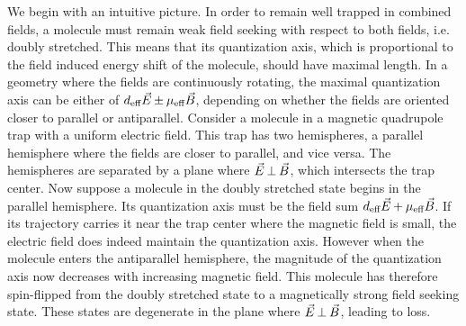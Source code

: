 \documentclass[%
 reprint,
 amsmath,amssymb,
 aps,
prl,
]{revtex4-1}
\newcommand{\epb}{{$\vec{E}\s {\perp}\s\vec{B}$}}
\newcommand{\s}{{\nobreak\hspace{.2em}}}
\begin{document}
We begin with an intuitive picture.
In order to remain well trapped in combined fields, a molecule must remain weak field seeking with respect to both fields, i.e. doubly stretched.
This means that its quantization axis, which is proportional to the field induced energy shift of the molecule, should have maximal length.
In a geometry where the fields are continuously rotating, the maximal quantization axis can be either of $d_\text{eff}\vec{E} \s {\pm}\s  \mu_\text{eff}\vec{B}$, depending on whether the fields are oriented closer to parallel or antiparallel.
Consider a molecule in a magnetic quadrupole trap with a uniform electric field.
This trap has two hemispheres, a parallel hemisphere where the fields are closer to parallel, and vice versa.
The hemispheres are separated by a plane where \epb{}, which intersects the trap center.
Now suppose a molecule in the doubly stretched state begins in the parallel hemisphere.
Its quantization axis must be the field sum $d_\text{eff}\vec{E} \s {+}\s  \mu_\text{eff}\vec{B}$.
If its trajectory carries it near the trap center where the magnetic field is small, the electric field does indeed maintain the quantization axis.
However when the molecule enters the antiparallel hemisphere, the magnitude of the quantization axis now decreases with increasing magnetic field. This molecule has therefore spin-flipped from the doubly stretched state to a magnetically strong field seeking state. These states are degenerate in the plane where \epb{}, leading to loss.

\end{document}
